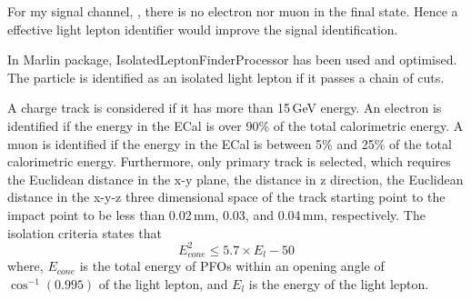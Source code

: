 For my signal channel, \eeToHHbbWW, there is no electron nor muon in the final state. Hence a effective light lepton identifier would improve the signal identification. 

In Marlin package, IsolatedLeptonFinderProcessor has been used and optimised. The particle is identified as an isolated light lepton if it passes a chain of cuts.
 
A charge track is considered if it has more than 15\,GeV energy. An electron is identified if the energy in the ECal is over 90\% of the total calorimetric energy. A muon is identified if the energy in the ECal is between 5\% and 25\% of the total calorimetric energy. Furthermore, only primary track is selected, which requires the Euclidean distance in the x-y plane, the distance in z direction, the Euclidean distance in the x-y-z three dimensional space of the track starting point to the impact point to be less than 0.02\,mm, 0.03\mm, and  0.04\,mm, respectively. The isolation criteria states that
\begin{equation}
E_{cone}^2 \leqslant 5.7 \times E_{l} - 50
\end{equation}
where, $E_{cone}$ is the total energy of PFOs within an opening angle of $\cos^{-1}(0.995)$ of the light lepton, and $E_{l}$ is the energy of the light lepton.
